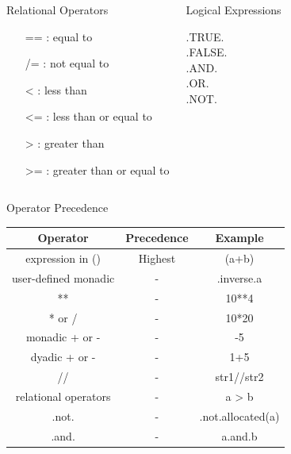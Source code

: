 \documentclass[slidestop,mathserif,compress,xcolor=svgnames]{beamer}
\begin{document}
\begin{frame}[allowframebreaks]
\begin{columns}
  \end{columns}
  \begin{columns}
    \column{4cm}
    \begin{block}{\scriptsize Relational Operators}
      \begin{itemize}
        \item[==]: equal to
        \item[/=]: not equal to
        \item[<]: less than
        \item[<=]: less than or equal to
        \item[>]: greater than
        \item[>=]: greater than or equal to
      \end{itemize}
    \end{block}
    \column{3cm}
    \begin{block}{\scriptsize Logical Expressions}
      \begin{description}
        \item[.TRUE.]  
        \item[.FALSE.]
        \item[.AND.]
        \item[.OR.]
        \item[.NOT.] 
      \end{description}
    \end{block}
  \end{columns}
  \begin{block}{{\scriptsize Operator Precedence}}
    \begin{center}
      {\tiny
      \begin{tabular}{ccc}
        Operator & Precedence & Example \\
        \hline
        expression in () & Highest & (a+b) \\
        user-defined monadic & - & .inverse.a \\
        ** & - & 10**4 \\
        * or / & - & 10*20 \\
        monadic + or - & - & -5 \\
        dyadic + or - & - & 1+5 \\
        // & - & str1//str2 \\
        relational operators & - & a > b \\
        .not. & - & .not.allocated(a) \\
        .and. & - & a.and.b \\

\end{tabular}}
\end{center}
\end{block}
\end{frame}
\end{document}
